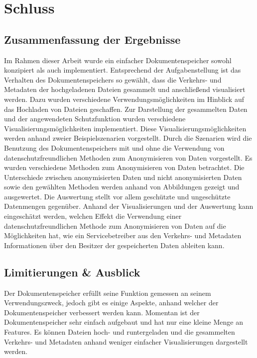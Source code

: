 \documentclass[
    fontsize=12pt,
    headings=small,
    parskip=half,           %
    bibliography=totoc,
    numbers=noenddot,       %
    open=any,               %
    ]{scrreprt}
\begin{document}
\chapter{Schluss}
\section{Zusammenfassung der Ergebnisse}

Im Rahmen dieser Arbeit wurde ein einfacher Dokumentenspeicher sowohl konzipiert als auch implementiert.
Entsprechend der Aufgabenstellung ist das Verhalten des Dokumentenspeichers so gewählt, dass die Verkehrs- und Metadaten der hochgeladenen Dateien gesammelt und anschließend visualisiert werden.
Dazu wurden verschiedene Verwendungsmöglichkeiten im Hinblick auf das Hochladen von Dateien geschaffen.
Zur Darstellung der gesammelten Daten und der angewendeten Schutzfunktion wurden verschiedene Visualisierungsmöglichkeiten implementiert.
Diese Visualisierungsmöglichkeiten werden anhand zweier Beispielszenarien vorgestellt.
Durch die Szenarien wird die Benutzung des Dokumentenspeichers mit und ohne die Verwendung von datenschutzfreundlichen Methoden zum Anonymisieren von Daten vorgestellt.
Es wurden verschiedene Methoden zum Anonymisieren von Daten betrachtet.
Die Unterschiede zwischen anonymisierten Daten und nicht anonymisierten Daten sowie den gewählten Methoden werden anhand von Abbildungen gezeigt und ausgewertet.
Die Auswertung stellt vor allem geschützte und ungeschützte Datenmengen gegenüber.
Anhand der Visualisierungen und der Auswertung kann eingeschätzt werden, welchen Effekt die Verwendung einer datenschutzfreundlichen Methode zum Anonymisieren von Daten auf die Möglichkeiten hat, wie ein Servicebetreiber aus den Verkehrs- und Metadaten Informationen über den Besitzer der gespeicherten Daten ableiten kann.

\section{Limitierungen \& Ausblick}
Der Dokumentenspeicher erfüllt seine Funktion gemessen an seinem Verwendungszweck, jedoch gibt es einige Aspekte, anhand welcher der Dokumentenspeicher verbessert werden kann.
Momentan ist der Dokumentenspeicher sehr einfach aufgebaut und hat nur eine kleine Menge an Features.
Es können Dateien hoch- und runtergeladen und die gesammelten Verkehrs- und Metadaten anhand weniger einfacher Visualisierungen dargestellt werden.
\end{document}
